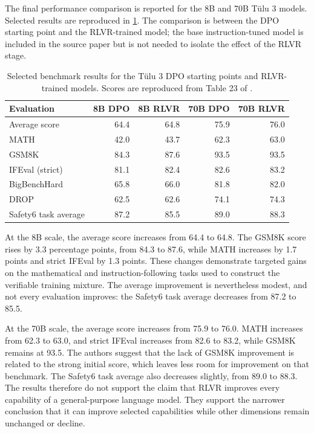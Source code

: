 The final performance comparison is reported for the 8B and 70B Tülu 3
models. Selected results are reproduced in
\cref{tab:rlvr-final-performance}. The comparison is between the DPO
starting point and the RLVR-trained model; the base instruction-tuned model
is included in the source paper but is not needed to isolate the effect of
the RLVR stage.

\begin{table}[htbp]
    \centering
    \caption{Selected benchmark results for the Tülu 3 DPO starting points
    and RLVR-trained models. Scores are reproduced from Table 23 of
    \textcite{lambert2025tulu3}.}
    \label{tab:rlvr-final-performance}
    \small
    \begin{tabularx}{\textwidth}{l r r r r}
        \toprule
        \textbf{Evaluation}
        & \textbf{8B DPO}
        & \textbf{8B RLVR}
        & \textbf{70B DPO}
        & \textbf{70B RLVR}\\
        \midrule
        Average score
        & 64.4 & 64.8 & 75.9 & 76.0\\
        MATH
        & 42.0 & 43.7 & 62.3 & 63.0\\
        GSM8K
        & 84.3 & 87.6 & 93.5 & 93.5\\
        IFEval (strict)
        & 81.1 & 82.4 & 82.6 & 83.2\\
        BigBenchHard
        & 65.8 & 66.0 & 81.8 & 82.0\\
        DROP
        & 62.5 & 62.6 & 74.1 & 74.3\\
        Safety6 task average
        & 87.2 & 85.5 & 89.0 & 88.3\\
        \bottomrule
    \end{tabularx}
\end{table}

At the 8B scale, the average score increases from 64.4 to 64.8. The
GSM8K score rises by 3.3 percentage points, from 84.3 to 87.6, while MATH
increases by 1.7 points and strict IFEval by 1.3 points. These changes
demonstrate targeted gains on the mathematical and instruction-following
tasks used to construct the verifiable training mixture. The average
improvement is nevertheless modest, and not every evaluation improves:
the Safety6 task average decreases from 87.2 to 85.5.

At the 70B scale, the average score increases from 75.9 to 76.0. MATH
increases from 62.3 to 63.0, and strict IFEval increases from 82.6 to
83.2, while GSM8K remains at 93.5. The authors suggest that the lack of
GSM8K improvement is related to the strong initial score, which leaves
less room for improvement on that benchmark. The Safety6 task average
also decreases slightly, from 89.0 to 88.3. The results therefore do not
support the claim that RLVR improves every capability of a general-purpose
language model. They support the narrower conclusion that it can improve
selected capabilities while other dimensions remain unchanged or decline.


